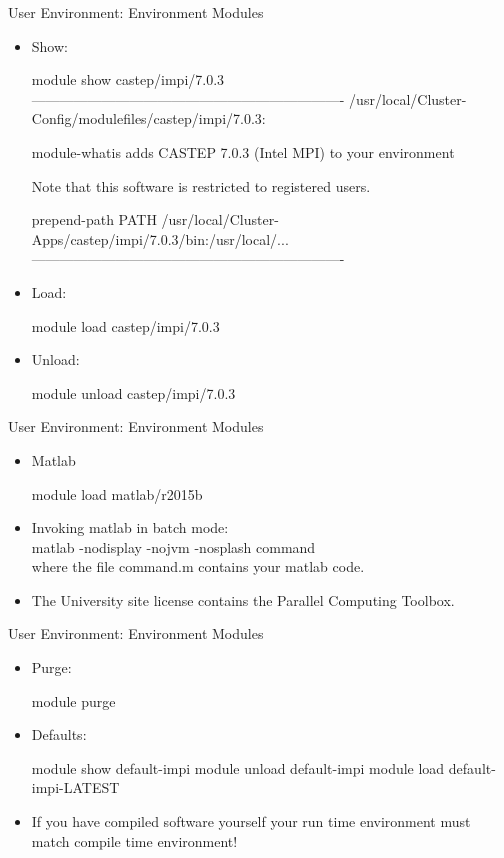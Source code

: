 \begin{frame}[fragile]{User Environment: Environment Modules}
\begin{itemize}
\item{Show:}
\begin{semiverbatim}
\tiny
module show castep/impi/7.0.3
-------------------------------------------------------------------
/usr/local/Cluster-Config/modulefiles/castep/impi/7.0.3:

module-whatis    adds CASTEP 7.0.3 (Intel MPI) to your environment 

Note that this software is restricted to registered users.

prepend-path     PATH /usr/local/Cluster-Apps/castep/impi/7.0.3/bin:/usr/local/...
-------------------------------------------------------------------
\end{semiverbatim}
\medskip
\item{Load:}
\begin{semiverbatim}
\scriptsize
module load castep/impi/7.0.3
\end{semiverbatim}
\medskip
\item{Unload:}
\begin{semiverbatim}
\scriptsize
module unload castep/impi/7.0.3
\end{semiverbatim}
\end{itemize}
\end{frame}

\begin{frame}[fragile]{User Environment: Environment Modules}
\begin{itemize}
\item{Matlab}
\begin{semiverbatim}
\scriptsize
module load matlab/r2015b
\end{semiverbatim}
\medskip\pause
\item{Invoking matlab in batch mode:\hfill\\
  \qquad \alert{matlab -nodisplay -nojvm -nosplash command}\hfill\\
  where the file \alert{command.m} contains your matlab code.}
  \pause
  \item{The University site license contains the Parallel Computing Toolbox.}
\end{itemize}
\end{frame}

\begin{frame}[fragile]{User Environment: Environment Modules}
\begin{itemize}
\item{Purge:}
\begin{semiverbatim}
\scriptsize
module purge
\end{semiverbatim}
\smallskip
\item{Defaults:}
\begin{semiverbatim}
\scriptsize
module show default-impi
module unload default-impi
module load default-impi-LATEST
\end{semiverbatim}
\medskip
\item{If you have compiled software yourself your run time environment must match compile time environment!}
\end{itemize}
\end{frame}

